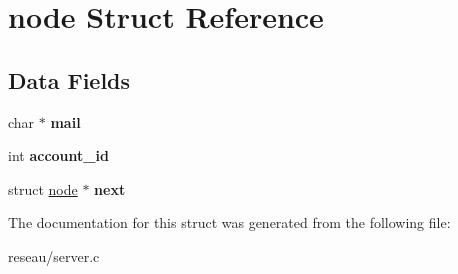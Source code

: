 \hypertarget{structnode}{}\section{node Struct Reference}
\label{structnode}
\subsection*{Data Fields}
\begin{DoxyCompactItemize}
\item 
\mbox{\label{structnode_af236e8ba7815eda2ff7daf67c80043bb}} 
char $\ast$ {\bfseries mail}
\item 
\mbox{\label{structnode_ab39bfb6e81304b9b818e754ff92a475b}} 
int {\bfseries account\+\_\+id}
\item 
\mbox{\label{structnode_a0dc1b6470487aa86d9936e3cab8b95be}} 
struct \mbox{\hyperlink{structnode}{node}} $\ast$ {\bfseries next}
\end{DoxyCompactItemize}


The documentation for this struct was generated from the following file\+:\begin{DoxyCompactItemize}
\item 
reseau/server.\+c\end{DoxyCompactItemize}
